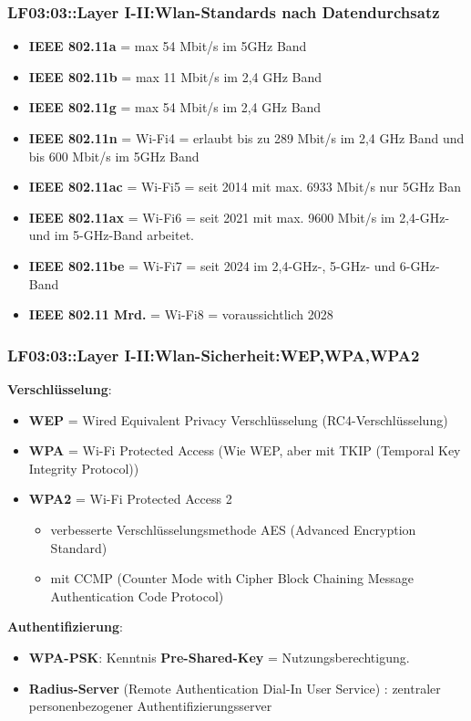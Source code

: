 \begin{frame}  
  \frametitle{LF03:03::Layer I-II:Wlan-Standards nach Datendurchsatz }
  \begin{small}

  \begin{itemize}
    \item \textbf{IEEE 802.11a} = max 54 Mbit/s im 5GHz Band
    \item \textbf{IEEE 802.11b} = max 11 Mbit/s im 2,4 GHz Band
    \item \textbf{IEEE 802.11g} = max 54 Mbit/s im 2,4 GHz Band
    \item \textbf{IEEE 802.11n} = Wi-Fi4 = erlaubt bis zu 289 Mbit/s im 2,4 GHz Band und bis 600 Mbit/s im 5GHz Band
    \item \textbf{IEEE 802.11ac} = Wi-Fi5 = seit 2014 mit max. 6933 Mbit/s nur 5GHz Ban
    \item \textbf{IEEE 802.11ax} = Wi-Fi6 = seit 2021 mit max. 9600 Mbit/s im 2,4-GHz- und im 5-GHz-Band arbeitet. 
    \item \textbf{IEEE 802.11be} = Wi-Fi7 = seit 2024 im 2,4-GHz-, 5-GHz- und 6-GHz-Band
    \item \textbf{IEEE 802.11 Mrd.} = Wi-Fi8 = voraussichtlich 2028 
  \end{itemize}
\end{small}

\end{frame}

\begin{frame}  
  \frametitle{LF03:03::Layer I-II:Wlan-Sicherheit:WEP,WPA,WPA2}

   \textbf{Verschlüsselung}:

  \begin{itemize}
    \item \textbf{WEP} = Wired Equivalent Privacy Verschlüsselung (RC4-Verschlüsselung)  
    \item \textbf{WPA} = Wi-Fi Protected Access (Wie WEP, aber mit TKIP (Temporal Key Integrity Protocol))
    \item \textbf{WPA2} = Wi-Fi Protected Access 2 
   \begin{itemize}
      \item verbesserte Verschlüsselungsmethode AES (Advanced Encryption Standard) 
      \item mit CCMP (Counter Mode with Cipher Block Chaining Message Authentication Code Protocol) 
    \end{itemize}  
  \end{itemize}

  \vspace{0.2cm}
  \textbf{Authentifizierung}:

  \begin{itemize}
    \item \textbf{WPA-PSK}:  Kenntnis \textbf{Pre-Shared-Key} =  Nutzungsberechtigung.
    \item \textbf{Radius-Server} (Remote Authentication Dial-In User Service) : zentraler personenbezogener Authentifizierungsserver
  \end{itemize}

\end{frame}

